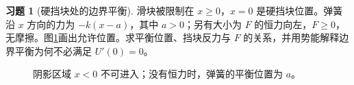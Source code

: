 \documentclass[11pt,openany,fontset=fandol]{ctexbook}
\theoremstyle{definition}\newtheorem{example}{例}[chapter]\newtheorem{exercise}{习题}[chapter]
\begin{document}
\par\medskip\noindent\begin{minipage}{\textwidth}
\begin{exercise}[硬挡块处的边界平衡]\label{mp5:exercise:l5-h7}
滑块被限制在 $x\ge0$，$x=0$ 是硬挡块位置。弹簧沿 $x$ 方向的力为 $-k(x-a)$，其中 $a>0$；另有大小为 $F$ 的恒力向左，$F\ge0$，无摩擦。图\ref{mp5:fig:l5-h7-q}画出允许位置。求平衡位置、挡块反力与 $F$ 的关系，并用势能解释边界平衡为何不必满足 $U\prime(0)=0$。
\end{exercise}

\begin{figure}[H]\centering
{}
\caption{阴影区域 $x<0$ 不可进入；没有恒力时，弹簧的平衡位置为 $a$。}\label{mp5:fig:l5-h7-q}
\end{figure}
\end{minipage}\par\medskip
\end{document}
